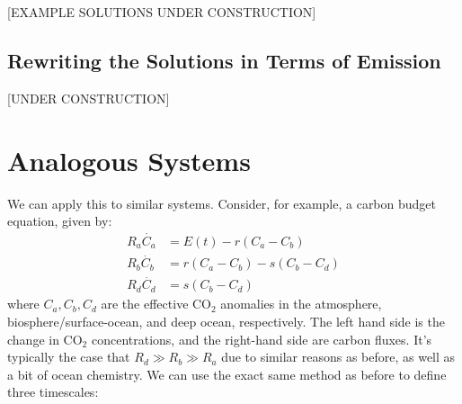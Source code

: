 [EXAMPLE SOLUTIONS UNDER CONSTRUCTION]

\subsection{Rewriting the Solutions in Terms of Emission}



[UNDER CONSTRUCTION]

\section{Analogous Systems}

We can apply this to similar systems. Consider, for example, a carbon budget equation, given by:
\begin{align}
    R_a \dot{C_a} &= E(t)-r (C_a-C_b) \\ 
    R_b \dot{C_b} &= r (C_a-C_b) - s (C_b-C_d)\\
    R_d \dot{C_d} &=  s (C_b-C_d)
\end{align}
where $C_a,C_b,C_d$ are the effective CO$_2$ anomalies in the atmosphere, biosphere/surface-ocean, and deep ocean, respectively. The left hand side is the change in CO$_2$ concentrations, and the right-hand side are carbon fluxes. It's typically the case that $R_d\gg R_b\gg R_a$ due to similar reasons as before, as well as a bit of ocean chemistry. We can use the exact same method as before to define three timescales:
